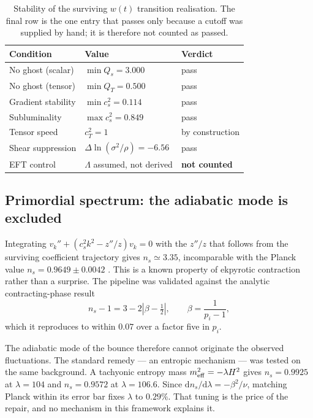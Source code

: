 \documentclass[a4paper,11pt]{article}
\begin{document}
\begin{table}[t]
\centering
\begin{tabular}{lll}
\toprule
Condition & Value & Verdict \\
\midrule
No ghost (scalar) & $\min Q_s = 3.000$ & pass \\
No ghost (tensor) & $\min Q_T = 0.500$ & pass \\
Gradient stability & $\min c_s^{2} = 0.114$ & pass \\
Subluminality & $\max c_s^{2} = 0.849$ & pass \\
Tensor speed & $c_T^{2} = 1$ & by construction \\
Shear suppression & $\Delta\ln(\sigma^{2}/\rho) = -6.56$ & pass \\
EFT control & $\Lambda$ assumed, not derived & \textbf{not counted} \\
\bottomrule
\end{tabular}
\caption{Stability of the surviving $w(t)$ transition realisation. The final row is the one entry that passes only because a cutoff was supplied by hand; it is therefore not counted as passed.}
\label{tab:stability}
\end{table}

\subsection{Primordial spectrum: the adiabatic mode is excluded}

Integrating $v_k''+(c_s^{2}k^{2}-z''/z)v_k=0$ with the $z''/z$ that follows from the surviving coefficient trajectory gives $n_s\simeq3.35$, incomparable with the Planck value $n_s=0.9649\pm0.0042$ \cite{Planck18}. This is a known property of ekpyrotic contraction rather than a surprise. The pipeline was validated against the analytic contracting-phase result
\begin{equation}
n_s-1=3-2\left|\beta-\tfrac12\right|,\qquad \beta=\frac{1}{p_i-1},
\end{equation}
which it reproduces to within $0.07$ over a factor five in $p_i$.

The adiabatic mode of the bounce therefore cannot originate the observed fluctuations. The standard remedy --- an entropic mechanism --- was tested on the same background. A tachyonic entropy mass $m_{\rm eff}^{2}=-\lambda H^{2}$ gives $n_s=0.9925$ at $\lambda=104$ and $n_s=0.9572$ at $\lambda=106.6$. Since $\mathrm{d}n_s/\mathrm{d}\lambda=-\beta^{2}/\nu$, matching Planck within its error bar fixes $\lambda$ to $0.29\%$. That tuning is the price of the repair, and no mechanism in this framework explains it.
\end{document}
